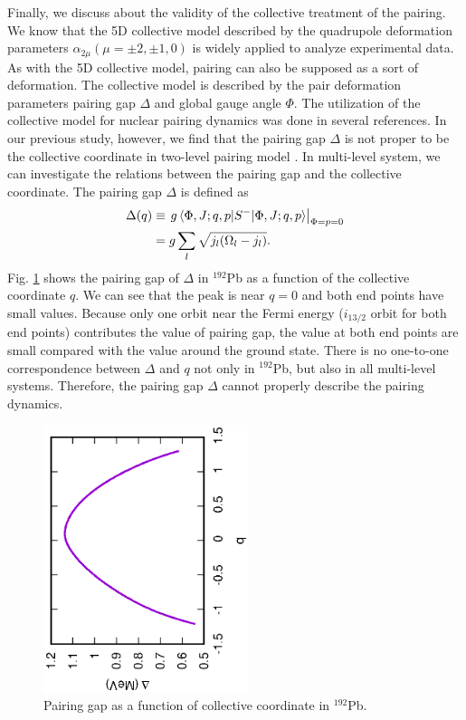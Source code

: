 \documentclass[%
superscriptaddress,
showpacs,
nofootinbib,
amsmath,amssymb,
aps,
prc,
twocolumn,
floatfix ]%
{revtex4-1}
\begin{document}
Finally, we discuss about the validity of the collective treatment of the pairing. We know that the 5D collective model described by the quadrupole deformation parameters $\alpha_{2\mu} (\mu=\pm2,\pm1,0)$ is widely applied to analyze experimental data. As with the 5D collective model, pairing can also be supposed as a sort of deformation. The collective model is described by the pair deformation parameters pairing gap $\Delta$ and global gauge angle $\Phi$. The utilization of the collective model for nuclear pairing dynamics was done in several references\cite{??}. In our previous study, however, we find that the pairing gap $\Delta$ is not proper to be the collective coordinate in two-level pairing model \cite{??}. In multi-level system, we can investigate the relations between the pairing gap and the collective coordinate. The pairing gap $\Delta$ is defined as
\begin{align}
  \Delta (q) &\equiv \left. g\braket{\Phi,J;q,p|S^-|\Phi,J;q,p} \right|_{\Phi=p=0} \nonumber \\
  &= g\sum_l \sqrt{j_l(\Omega_l-j_l)} .
\end{align}
Fig. \ref{192Pb_gap} shows the pairing gap of $\Delta$ in ${}^{192}$Pb as a function of the collective coordinate $q$. We can see that the peak is near $q=0$ and both end points have small values. Because only one orbit near the Fermi energy ($i_{13/2}$ orbit for both end points) contributes the value of pairing gap, the value at both end points are small compared with the value around the ground state. There is no one-to-one correspondence between $\Delta$ and $q$ not only in ${}^{192}$Pb, but also in all multi-level systems. Therefore, the pairing gap $\Delta$ cannot properly describe the pairing dynamics. 
\begin{figure}[htbp]
 \begin{center}
  \includegraphics[width=60mm,angle=-90]{192Pbgap.eps}
 \end{center}
	\caption{Pairing gap as a function of collective coordinate in ${}^{192}$Pb. 
}
 \label{192Pb_gap}
\end{figure}
\end{document}
